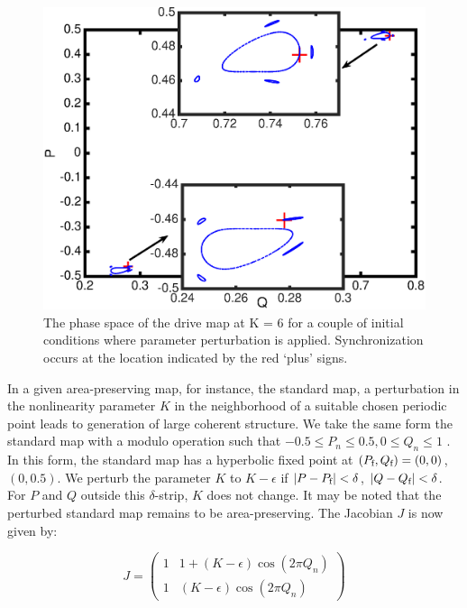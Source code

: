 \documentclass[reprint,amsmath,amssymb,aps,pre]{revtex4-1}
\begin{document}
\begin{figure}[t]
    \includegraphics[scale=0.45]{Fast_sync_location.eps}
    \caption{\label{fig:location}\footnotesize The phase space of the drive 
        map at K = 6 for a couple of initial conditions where parameter 
        perturbation is applied. Synchronization occurs at the location 
        indicated
        by the red `plus' signs.}
\end{figure}
In a given area-preserving map, for instance, the  standard map, a  
perturbation in the nonlinearity parameter $K$ in the neighborhood of a 
suitable chosen periodic point leads to generation of large coherent 
structure.   We take the same form the standard map with a modulo operation 
such that $-0.5 \leq P_n \leq 0.5, 0\leq Q_n \leq 1$ . In this form, the 
standard map has a hyperbolic fixed point at 
$(P_\textnormal{f},Q_\textnormal{f}) = (0,0)$,$(0,0.5)$. We perturb the 
parameter $K$ to $K-\epsilon$ if $|P - P_\textnormal{f}| 
< \delta$, $|Q-Q_\textnormal{f}| < \delta$. For $P$ and $Q$ outside this 
$\delta$-strip, 
$K$ does not change.  It may be noted that the perturbed standard map remains 
to be area-preserving. The Jacobian $J$ is now given by: 

\begin{minipage}[t]{0.45\textwidth}
	\centering
	\[ J = \left( \begin{array}{cc}
	1 & 1 + (K-\epsilon)\cos(2\pi Q_n)   \\
	1 & (K-\epsilon)\cos(2\pi Q_n) \end{array} \right)\]
\end{minipage}
\end{document}
